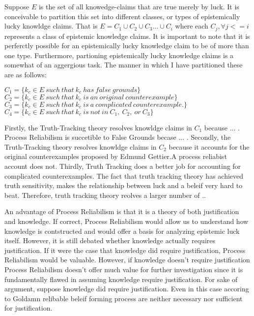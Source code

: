 \documentclass{article}
\begin{document}
Suppose $E$ is the set of all knowedge-claims that are true merely by luck.
It is conceivable to partition this set into different classes, or types
of epistemically lucky knowldge claims. That is $E = C_{1} \cup C_{2} \cup
C_{3} ... \cup C_{i}$ where each $C_{j}, \forall j <= i$ represents a class
of epistemic knowledge claims. It is important to note that it is perferctly
possible for an epistemically lucky knowledge claim to be of more than one type.
Furthermore, partioning epistemically lucky knowledge claims is a somewhat of an
aggergious task. The manner in which I have partitioned these are as follows:
\begin{displayquote}
$ C_{1} = \{ k_{c} \in E \ such \ that \ k_{c} \ has \ false \ grounds \} $ \\
$ C_{2} = \{ k_{c} \in E \ such \ that \ k_{c} \ is \ an \ original \ counterexample \} $ \\
$ C_{3} = \{ k_{c} \in E \ such \ that \ k_{c} \ is \ a \ complicated \ counterexample. \} $ \\
$ C_{4} = \{ k_{c} \in E \ such \ that \ k_{c} \ is \ not \ in \ C_{1}, \ C_{2},
\ or \ C_{3}  \} $ \\
\end{displayquote}

Firstly, the Truth-Tracking theory resolves knowldge claims in $C_{1}$ because ... .
Process Reliabilism is succetible to False Grounds becase ... .
Secondly, the Truth-Tracking theory resolves knowldge claims in $C_{2}$ because
it accounts for the original counterexamples proposed by Edmund Gettier.A process
reliabist account does not. Thirdly, Truth Tracking does a better job for accounting
for complicated counterexamples. The fact that truth tracking theory has achieved
truth sensitivity, makes the relationship between luck and a beleif very hard to
beat. Therefore, truth tracking theory reolves a larger number of ..

An advantage of Process Reliabilism is that it is a theory of both justification
and knowledge. If correct, Process Reliabilism would allow us to understand how
knowledge is contstructed and would offer a basis for analyzing epistemic luck
itself. However, it is still debated whether knowledge actually requires justification.
If it were the case that knowledge did require justification, Process Reliabilism
would be valuable. However, if knowledge doesn't require justification
Process Reliabilism doesn't offer much value for further investigation
since it is fundamentally flawed in assuming knowledge require justification.
For sake of argument, suppose knowledge did require justification. Even in
this case accoring to Goldamn relibable beleif forming process are neither necessary
nor sufficient for justification.
\end{document}
